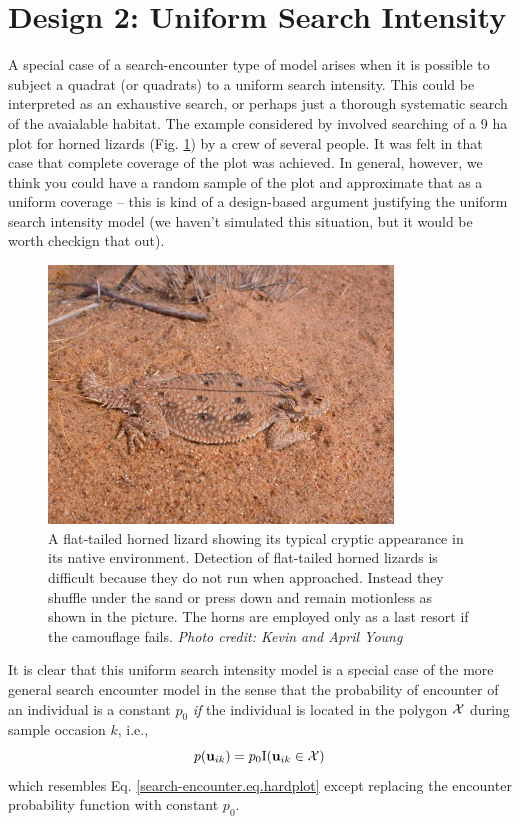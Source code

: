 \section{Design 2: Uniform Search Intensity}

A special case of a search-encounter type of model arises when it is
possible to subject a quadrat (or quadrats) to a uniform search
intensity. This could be interpreted as an exhaustive search, or
perhaps just a thorough systematic search of the avaialable habitat.
The example considered by \citet{royle_young:2008} involved searching
of a 9 ha plot for horned lizards (Fig.
\ref{searchencounter.fig.hornylizard}) by a crew of
several people. It was felt in that case that complete coverage of
the plot was achieved. In general, however, we think you could have
a random sample of the plot and approximate that as a uniform coverage
-- this is kind of a design-based argument justifying the uniform
search intensity model (we haven't simulated this situation, but it
would be worth checkign that out).

\begin{figure}
\centering
\includegraphics[width=3.6in,height=2.7in]{Ch15-searchencounter/figs/horny_lizard.jpg}
\caption{A flat-tailed horned lizard showing its typical cryptic
  appearance in its native environment.  Detection of flat-tailed
  horned lizards is difficult because they do not run when
  approached. Instead they shuffle under the sand or press down and
  remain motionless as shown in the picture.  The horns are employed
  only as a last resort if the camouflage fails.  {\it Photo credit:
    Kevin and April Young} }
\label{searchencounter.fig.hornylizard}
\end{figure}

It is clear that this uniform search intensity model is a special case
of the more general search encounter model in the sense that the
probability of encounter of an individual is a constant $p_{0}$ {\it
  if} the individual is located in the polygon ${\cal X}$ during
sample occasion $k$, i.e.,
\[
p({\bf u}_{ik}) = p_{0} \mbox{I}({\bf u}_{ik} \in {\cal X})
\]
which resembles Eq. \ref{search-encounter.eq.hardplot} except
replacing the encounter probability function with constant $p_{0}$.

